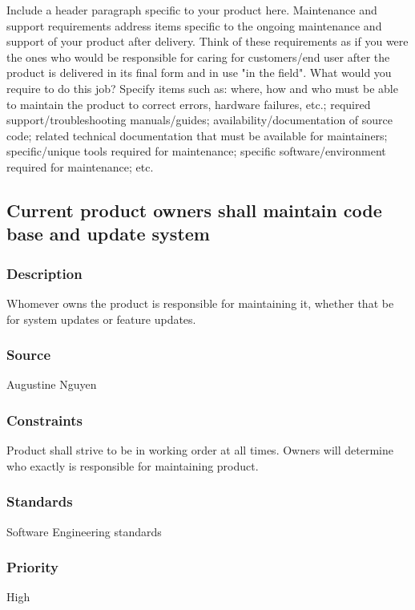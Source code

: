 Include a header paragraph specific to your product here. Maintenance and support requirements address items specific to the ongoing maintenance and support of your product after delivery. Think of these requirements as if you were the ones who would be responsible for caring for customers/end user after the product is delivered in its final form and in use "in the field". What would you require to do this job? Specify items such as: where, how and who must be able to maintain the product to correct errors, hardware failures, etc.; required support/troubleshooting manuals/guides; availability/documentation of source code; related technical documentation that must be available for maintainers; specific/unique tools required for maintenance; specific software/environment required for maintenance; etc.
\subsection{Current product owners shall maintain code base and update system}
\subsubsection{Description}
Whomever owns the product is responsible for maintaining it, whether that be for system updates or feature updates.
\subsubsection{Source}
Augustine Nguyen
\subsubsection{Constraints}
Product shall strive to be in working order at all times.  Owners will determine who exactly is responsible for maintaining product.
\subsubsection{Standards}
Software Engineering standards
\subsubsection{Priority}
High